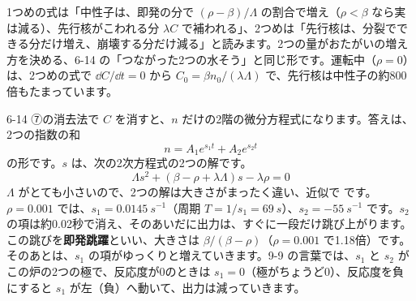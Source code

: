 \begin{phyomi}[1点炉の動特性の式]
1つめの式は「中性子は、即発の分で $(\rho-\beta)/\Lambda$ の割合で増え（$\rho<\beta$ なら実は減る）、先行核がこわれる分 $\lambda C$ で補われる」、2つめは「先行核は、分裂でできる分だけ増え、崩壊する分だけ減る」と読みます。2つの量がおたがいの増え方を決める、6-14 の「つながった2つの水そう」と同じ形です。運転中（$\rho=0$）は、2つめの式で $\dd C/\dd t=0$ から $C_0=\beta n_0/(\lambda\Lambda)$ で、先行核は中性子の約800倍もたまっています。
\end{phyomi}

\begin{phmodel}[1点炉・遅発中性子1群]
\end{phmodel}

6-14 ⑦の消去法で $C$ を消すと、$n$ だけの2階の微分方程式になります。答えは、2つの指数の和
\[ n=A_1e^{s_1t}+A_2e^{s_2t} \]
の形です。$s$ は、次の2次方程式の2つの解です。
\[ \Lambda s^2+(\beta-\rho+\lambda\Lambda)s-\lambda\rho=0 \]
$\Lambda$ がとても小さいので、2つの解は大きさがまったく違い、近似で
です。$\rho=0.001$ では、$s_1=\qty{0.0145}{s^{-1}}$（周期 $T=1/s_1=\qty{69}{s}$）、$s_2=\qty{-55}{s^{-1}}$ です。$s_2$ の項は約0.02秒で消え、そのあいだに出力は、すぐに一段だけ跳び上がります。この跳びを\textbf{即発跳躍}といい、大きさは $\beta/(\beta-\rho)$（$\rho=0.001$ で1.18倍）です。そのあとは、$s_1$ の項がゆっくりと増えていきます。9-9 の言葉では、$s_1$ と $s_2$ がこの炉の2つの極で、反応度が0のときは $s_1=0$（極がちょうど0）、反応度を負にすると $s_1$ が左（負）へ動いて、出力は減っていきます。

